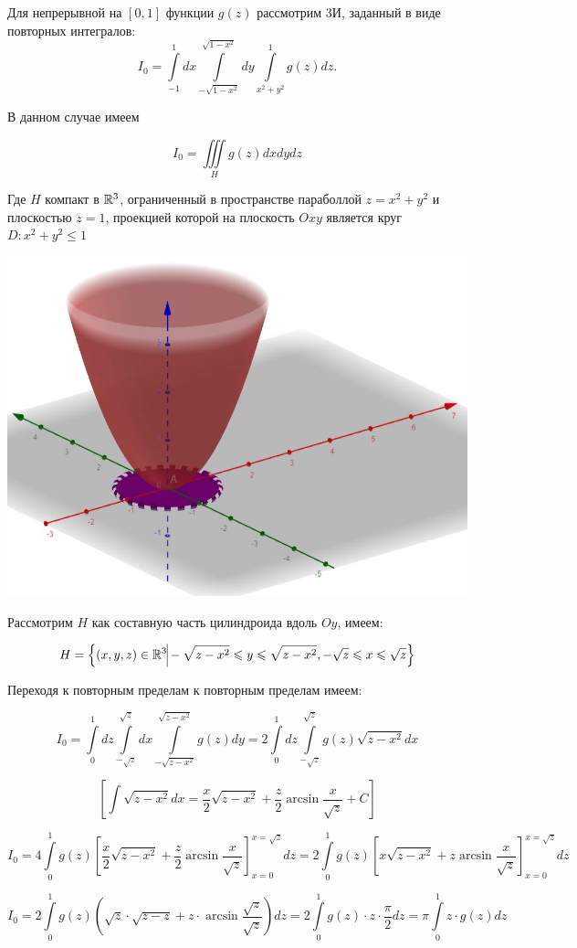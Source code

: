 \documentclass[../../main.tex]{subfiles}
\begin{document}
	\begin{example}
		Для непрерывной на $\left[0, 1\right]$ функции $g\left(z \right)$ рассмотрим 
		3И, заданный в виде повторных интегралов:
			\[I_0 = \int\limits_{-1}^1dx\int\limits_{-\sqrt{1 - x^2}}^{\sqrt{1 - 
			x^2}}dy\int\limits_{x^2 + y^2}^1 g\left(z\right)dz.\]
		
		В данном случае имеем
		
		\[I_0 = \iiint\limits_{H} g(z) dxdydz\]
		
		Где $H$ компакт в $\mathbb{R}^3$, ограниченный в пространстве параболлой $z = x^2 + 
		y^2$ и плоскостью $z = 1$, проекцией которой на плоскость $Oxy$ является 
		круг $D: x^2 + y^2 \leq 1$
		
		\begin{center}
		\includegraphics[scale = 0.7]{lec14.jpg}
		\end{center}
		
		Рассмотрим $H$ как составную часть цилиндроида вдоль $Oy$, имеем:
		
		\[H = \left\{\left(x, y, z\right) \in \R^3 \vline -\sqrt{z - x^2} \leq y 
		\leq \sqrt{z - x^2}, -\sqrt{z} \leq x \leq \sqrt{z} \right\}\]
		
		Переходя к повторным пределам к повторным пределам имеем:
		
		\[I_0 = 
		\int\limits_0^1dz\int\limits_{-\sqrt{z}}^{\sqrt{z}}dx\int\limits_{-\sqrt{z - 
		x^2}}^{\sqrt{z - x^2}}g\left(z\right)dy = 
		2\int\limits_0^1dz\int\limits_{-\sqrt{z}}^{\sqrt{z}}g\left(z\right)\sqrt{z - 
		x^2}dx \]
		
		\[\left[\int\sqrt{z - x^2}dx = \frac{x}{2}\sqrt{z - x^2} + 
		\frac{z}{2}\arcsin{\frac{x}{\sqrt{z}}} + C\right]\]
		
		\[I_0 = 4 \int\limits_0^1 g\left(z\right) \left[ \frac{x}{2}\sqrt{z - x^2} + 
		\frac{z}{2}\arcsin{\frac{x}{\sqrt{z}}}\right]_{x=0}^{x=\sqrt{z}}dz= 2 
		\int\limits_0^1 g\left(z\right) \left[x\sqrt{z - x^2} + 
		z\arcsin{\frac{x}{\sqrt{z}}}\right]_{x=0}^{x=\sqrt{z}}dz\]
		
		\[I_0 = 2 \int\limits_0^1 g\left(z\right) \left(\sqrt{z} \cdot \sqrt{z-z} + 
		z \cdot \arcsin{\frac{\sqrt{z}}{\sqrt{z}}}\right) dz = 2 \int\limits_0^1 
		g\left(z\right) \cdot z \cdot \frac{\pi}{2} dz = \pi \int\limits_0^1 z \cdot 
		g\left(z\right)dz\] 
		
	\end{example}
\end{document}

